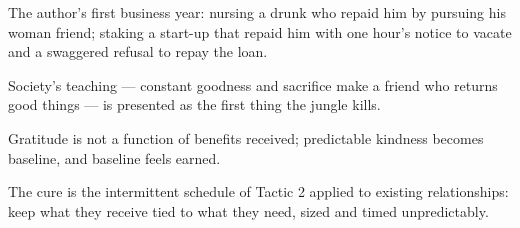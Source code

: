 

\begin{distilled}
  \item The author's first business year: nursing a drunk who repaid him by pursuing his woman friend; staking a start-up that repaid him with one hour's notice to vacate and a swaggered refusal to repay the loan.
  \item Society's teaching --- constant goodness and sacrifice make a friend who returns good things --- is presented as the first thing the jungle kills.
  \item Gratitude is not a function of benefits received; predictable kindness becomes baseline, and baseline feels earned.
  \item The cure is the intermittent schedule of Tactic 2 applied to existing relationships: keep what they receive tied to what they need, sized and timed unpredictably.
\end{distilled}
